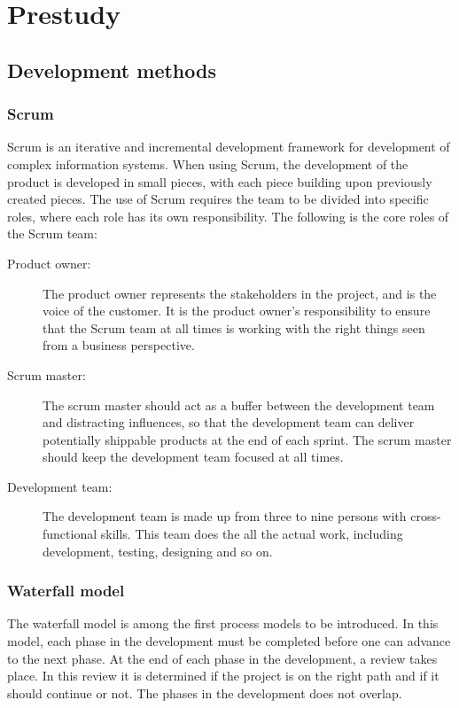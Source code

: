 \chapter{Prestudy}
\section{Development methods}
\subsection{Scrum}
Scrum is an iterative and incremental development framework for development of complex information systems. When using Scrum, the development of the product is developed in small pieces, with each piece building upon previously created pieces. The use of Scrum requires the team to be divided into specific roles, where each role has its own responsibility. The following is the core roles of the Scrum team:
\begin{description}
	\item[Product owner:]{The product owner represents the stakeholders in the project, and is the voice of the customer. It is the product owner's responsibility to ensure that the Scrum team at all times is working with the right things seen from a business perspective.}
	\item[Scrum master:]{The scrum master should act as a buffer between the development team and distracting influences, so that the development team can deliver potentially shippable products at the end of each sprint. The scrum master should keep the development team focused at all times.}
	\item[Development team:]{The development team is made up from three to nine persons with cross-functional skills. This team does the all the actual work, including development, testing, designing and so on.}
\end{description}

\subsection{Waterfall model}
The waterfall model is among the first process models to be introduced. In this model, each phase in the development must be completed before one can advance to the next phase. At the end of each phase in the development, a review takes place. In this review it is determined if the project is on the right path and if it should continue or not. The phases in the development does not overlap.

